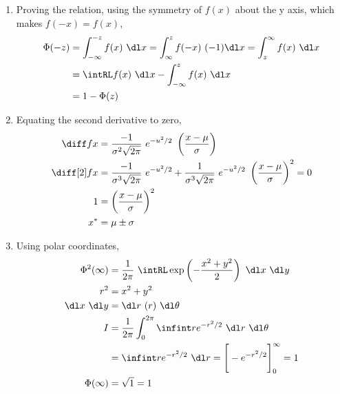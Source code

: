 \begin{enumerate}
\begin{enumerate}
              \item Proving the relation, using the symmetry of $ f(x) $ about the
                    y axis, which makes $ f(-x) = f(x) $,
                    \begin{align}
                        \Phi(-z) & = \int_{-\infty}^{-z} f(x)\ \dl x
                        = \int_{\infty}^{z} f(-x)\ (-1)\dl x = \int_{z}^{\infty}
                        f(x)\ \dl x                                          \\
                                 & = \intRL f(x)\ \dl x - \int_{-\infty}^{z}
                        f(x)\ \dl x                                          \\
                                 & = 1 - \Phi(z)
                    \end{align}

              \item Equating the second derivative to zero,
                    \begin{align}
                        \diff fx    & = \frac{-1}{\sigma^2 \sqrt{2\pi}}\ e^{-u^2/2}
                        \ \left( \frac{x-\mu}{\sigma} \right)                       \\
                        \diff[2] fx & = \frac{-1}{\sigma^3 \sqrt{2\pi}}\ e^{-u^2/2}
                        + \frac{1}{\sigma^3 \sqrt{2\pi}}\ e^{-u^2/2}
                        \ \left( \frac{x-\mu}{\sigma} \right)^2 = 0                 \\
                        1           & = \left( \frac{x-\mu}{\sigma} \right)^2       \\
                        x^*         & = \mu \pm \sigma
                    \end{align}
              \item Using polar coordinates,
                    \begin{align}
                        \Phi^2(\infty) & = \frac{1}{2\pi}\ \intRL \exp\left(
                        -\frac{x^2 + y^2}{2} \right)\ \dl x\ \dl y                \\
                        r^2            & = x^2 + y^2                              \\
                        \dl x\ \dl y   & = \dl r\ (r)\ \dl \theta                 \\
                        I              & = \frac{1}{2\pi} \int_{0}^{2\pi} \infint
                        re^{-r^2/2}\ \dl r\ \dl \theta                            \\
                                       & = \infint re^{-r^2/2}\ \dl r
                        = \Bigg[-e^{-r^2/2}\Bigg]_0^\infty = 1                    \\
                        \Phi(\infty)   & = \sqrt{1} = 1
                    \end{align}


\end{enumerate}
\end{enumerate}
